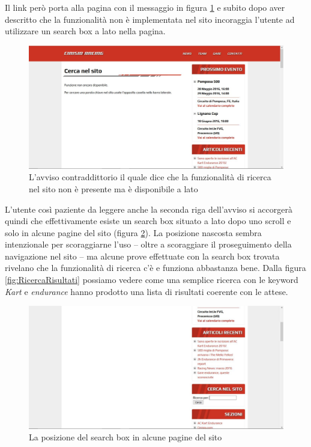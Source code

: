 	Il link però porta alla pagina con il messaggio in figura \ref{fig:RicercaNonDisponibile} e subito dopo aver descritto che la funzionalità non è implementata nel sito incoraggia l'utente ad utilizzare un search box a lato nella pagina. 
	
	\begin{figure} [h]
		\centering
		\includegraphics[width=\textwidth]{images/PoorSearchBox}
		\caption{L'avviso contraddittorio il quale dice che la funzionalità di ricerca nel sito non è presente ma è disponibile a lato}
		\label{fig:RicercaNonDisponibile}
	\end{figure}
	
	L'utente così paziente da leggere anche la seconda riga dell'avviso si accorgerà quindi che effettivamente esiste un search box situato a lato dopo uno scroll e solo in alcune pagine del sito (figura \ref{fig:RicercaSearchBox}). La posizione nascosta sembra intenzionale per scoraggiarne l'uso -- oltre a scoraggiare il proseguimento della navigazione nel sito -- ma alcune prove effettuate con la search box trovata rivelano che la funzionalità di ricerca c'è e funziona abbastanza bene. Dalla figura \ref{fig:RicercaRisultati} possiamo vedere come una semplice ricerca con le keyword \textit{Kart} e \textit{endurance} hanno prodotto una lista di risultati coerente con le attese.
	
	\begin{figure} [h]
		\centering
		\includegraphics[width=\textwidth]{images/FinallyTheSearchBox}
		\caption{La posizione del search box in alcune pagine del sito}
		\label{fig:RicercaSearchBox}
	\end{figure}
	
